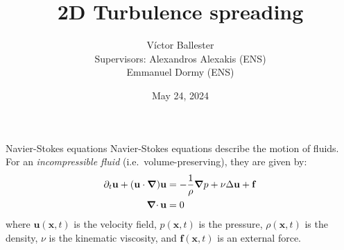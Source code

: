 \documentclass{beamer} %
\title{2D Turbulence spreading}
\author{
	Víctor Ballester\texorpdfstring{\vspace{0.45cm}\\}{}{\small Supervisors: Alexandros Alexakis (ENS)\texorpdfstring{\\}{}
\hspace{1.5cm} Emmanuel Dormy (ENS)}}
\date{May 24, 2024}
\begin{document}
\thispagestyle{empty}
\frame[noframenumbering]{\titlepage}
\setcounter{framenumber}{0}
\begin{frame}{Navier-Stokes equations}
	\textcolor{\mycolorhighlight}{Navier-Stokes equations} describe the motion of fluids. For an \emph{incompressible fluid} (i.e.\ volume-preserving), they are given by:
	\begin{align*}
		\partial_t \mathbf{u} + (\mathbf{u} \cdot \grad) \mathbf{u} & = -\frac{1}{\rho}\grad p + \nu \Delta \mathbf{u} + \mathbf{f} \\
		\operatorname{\boldsymbol{\mathrm{\nabla}}\cdot} \mathbf{u}                                            & = 0
	\end{align*}
	where $\mathbf{u}(\mathbf{x},t)$ is the velocity field, $p(\mathbf{x},t)$ is the pressure, $\rho(\mathbf{x},t)$ is the density, $\nu$ is the kinematic viscosity, and $\mathbf{f}(\mathbf{x},t)$ is an external force.


\end{frame}
\end{document}

